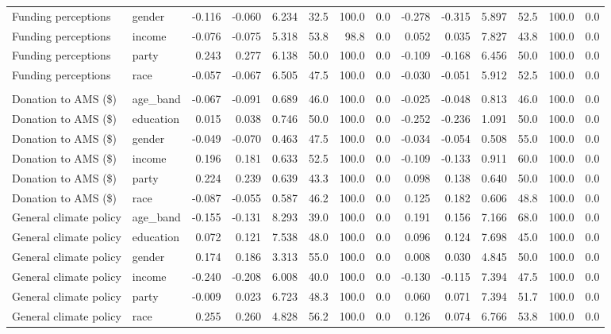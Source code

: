 \documentclass[
  letterpaper,
  DIV=11,
  numbers=noendperiod]{scrartcl}
\begin{document}
\begin{table}
{\begin{tabular*}{\linewidth}{@{\extracolsep{\fill}}llrrrrrrrrrrrr}
Funding perceptions & gender & -0.116 & -0.060 & 6.234 & 32.5 & 100.0 & 0.0 & -0.278 & -0.315 & 5.897 & 52.5 & 100.0 & 0.0 \\ 
Funding perceptions & income & -0.076 & -0.075 & 5.318 & 53.8 & 98.8 & 0.0 & 0.052 & 0.035 & 7.827 & 43.8 & 100.0 & 0.0 \\ 
Funding perceptions & party & 0.243 & 0.277 & 6.138 & 50.0 & 100.0 & 0.0 & -0.109 & -0.168 & 6.456 & 50.0 & 100.0 & 0.0 \\ 
Funding perceptions & race & -0.057 & -0.067 & 6.505 & 47.5 & 100.0 & 0.0 & -0.030 & -0.051 & 5.912 & 52.5 & 100.0 & 0.0 \\ 
\midrule\addlinespace[2.5pt]
\multicolumn{14}{l}{{\bfseries Tertiary}} \\[2.5pt] 
\midrule\addlinespace[2.5pt]
Donation to AMS (\$) & age\_band & -0.067 & -0.091 & 0.689 & 46.0 & 100.0 & 0.0 & -0.025 & -0.048 & 0.813 & 46.0 & 100.0 & 0.0 \\ 
Donation to AMS (\$) & education & 0.015 & 0.038 & 0.746 & 50.0 & 100.0 & 0.0 & -0.252 & -0.236 & 1.091 & 50.0 & 100.0 & 0.0 \\ 
Donation to AMS (\$) & gender & -0.049 & -0.070 & 0.463 & 47.5 & 100.0 & 0.0 & -0.034 & -0.054 & 0.508 & 55.0 & 100.0 & 0.0 \\ 
Donation to AMS (\$) & income & 0.196 & 0.181 & 0.633 & 52.5 & 100.0 & 0.0 & -0.109 & -0.133 & 0.911 & 60.0 & 100.0 & 0.0 \\ 
Donation to AMS (\$) & party & 0.224 & 0.239 & 0.639 & 43.3 & 100.0 & 0.0 & 0.098 & 0.138 & 0.640 & 50.0 & 100.0 & 0.0 \\ 
Donation to AMS (\$) & race & -0.087 & -0.055 & 0.587 & 46.2 & 100.0 & 0.0 & 0.125 & 0.182 & 0.606 & 48.8 & 100.0 & 0.0 \\ 
General climate policy & age\_band & -0.155 & -0.131 & 8.293 & 39.0 & 100.0 & 0.0 & 0.191 & 0.156 & 7.166 & 68.0 & 100.0 & 0.0 \\ 
General climate policy & education & 0.072 & 0.121 & 7.538 & 48.0 & 100.0 & 0.0 & 0.096 & 0.124 & 7.698 & 45.0 & 100.0 & 0.0 \\ 
General climate policy & gender & 0.174 & 0.186 & 3.313 & 55.0 & 100.0 & 0.0 & 0.008 & 0.030 & 4.845 & 50.0 & 100.0 & 0.0 \\ 
General climate policy & income & -0.240 & -0.208 & 6.008 & 40.0 & 100.0 & 0.0 & -0.130 & -0.115 & 7.394 & 47.5 & 100.0 & 0.0 \\ 
General climate policy & party & -0.009 & 0.023 & 6.723 & 48.3 & 100.0 & 0.0 & 0.060 & 0.071 & 7.394 & 51.7 & 100.0 & 0.0 \\ 
General climate policy & race & 0.255 & 0.260 & 4.828 & 56.2 & 100.0 & 0.0 & 0.126 & 0.074 & 6.766 & 53.8 & 100.0 & 0.0 \\ 
\bottomrule
\end{tabular*}

}

\end{table}%
\end{document}
